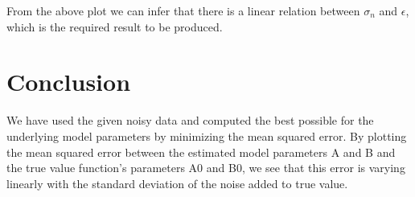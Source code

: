 \documentclass[11pt, a4paper]{article}
\begin{document}
 From the above plot we can infer that there is a linear relation between $\sigma_n$ and $\epsilon$, which is the required result to be produced.

\section{Conclusion}
We have used the given noisy data and computed the best possible for the underlying model parameters by minimizing the mean squared error. By plotting the mean squared error between the estimated model parameters A and B and the true value function's parameters A0 and B0, we see that this error is varying linearly with the standard deviation of the noise added to true value.
\end{document}
